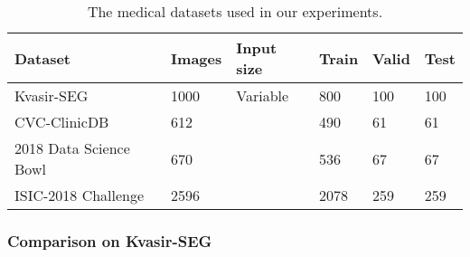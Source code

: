 \documentclass[journal,twoside,web]{IEEEtran}
\begin{document}
\begin{table} [t!]
 \caption{{The medical datasets used in our experiments. }}
    \label{table:datasettable}
\footnotesize
    \centering
    \begin{tabular}{p{2.8cm}|p{0.8cm}|p{1.2cm}|p{0.5cm}|p{0.5cm}|p{0.5cm}}
\toprule
        \textbf{Dataset} & \textbf{Images} & \textbf{Input size} & \textbf{Train} & \textbf{Valid}& \textbf{Test}\\ 
              \hline
              \hline
        Kvasir-SEG~\cite{jha2020kvasir}  & 1000 & Variable &800 &100 &100\\  \hline
        CVC-ClinicDB~\cite{bernal2015wm} & 612 &  &490  & 61& 61 \\  \hline
        2018 Data Science Bowl~\cite{caicedo2019nucleus} & 670 &  &536 &67 & 67\\ \hline
        ISIC-2018 Challenge~\cite{codella2018skin,tschandl2018ham10000}& 2596 &  &2078 &259 &259 \\ 
        \hline
        \bottomrule
\end{tabular}
\vspace{-5mm}
\end{table}	
\subsubsection{Comparison on Kvasir-SEG}
\end{document}
